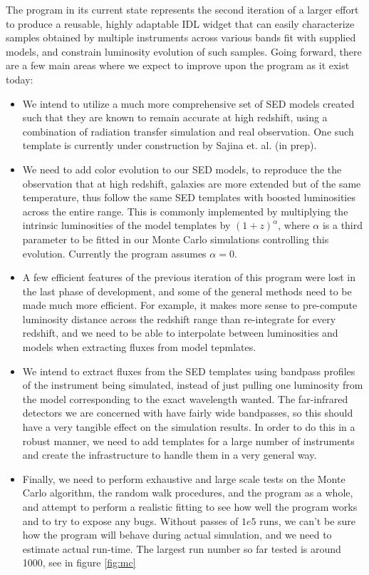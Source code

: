 \documentclass[twocolumn,letterpaper,10pt]{article}
\begin{document}
The program in its current state represents the second iteration of a larger effort to produce a reusable, highly adaptable IDL widget that can easily characterize samples obtained by multiple instruments across various bands fit with supplied models, and constrain luminosity evolution of such samples. Going forward, there are a few main areas where we expect to improve upon the program as it exist today:
\begin{itemize} \itemsep0pt \parskip0pt 
\item We intend to utilize a much more comprehensive set of SED models created such that they are known to remain accurate at high redshift, using a combination of radiation transfer simulation and real observation. One such template is currently under construction by Sajina et. al. (in prep).
\item We need to add color evolution to our SED models, to reproduce the the observation that at high redshift, galaxies are more extended but of the same temperature, thus follow the same SED templates with boosted luminosities across the entire range. This is commonly implemented by multiplying the intrinsic luminosities of the model templates by $(1+z)^\alpha$, where $\alpha$ is a third parameter to be fitted in our Monte Carlo simulations controlling this evolution. Currently the program assumes $\alpha=0$.
\item A few efficient features of the previous iteration of this program were lost in the last phase of development, and some of the general methods need to be made much more efficient. For example, it makes more sense to pre-compute luminosity distance across the redshift range than re-integrate for every redshift, and we need to be able to interpolate between luminosities and models when extracting fluxes from model tepmlates.
\item We intend to extract fluxes from the SED templates using bandpass profiles of the instrument being simulated, instead of just pulling one luminosity from the model corresponding to the exact wavelength wanted. The far-infrared detectors we are concerned with have fairly wide bandpasses, so this should have a very tangible effect on the simulation results. In order to do this in a robust manner, we need to add templates for a large number of instruments and create the infrastructure to handle them in a very general way.
\item Finally, we need to perform exhaustive and large scale tests on the Monte Carlo algorithm, the random walk procedures, and the program as a whole, and attempt to perform a realistic fitting to see how well the program works and to try to expose any bugs. Without passes of $1e5$ runs, we can't be sure how the program will behave during actual simulation, and we need to estimate actual run-time. The largest run number so far tested is around 1000, see in figure \ref{fig:mc}
\end{itemize}
\end{document}
